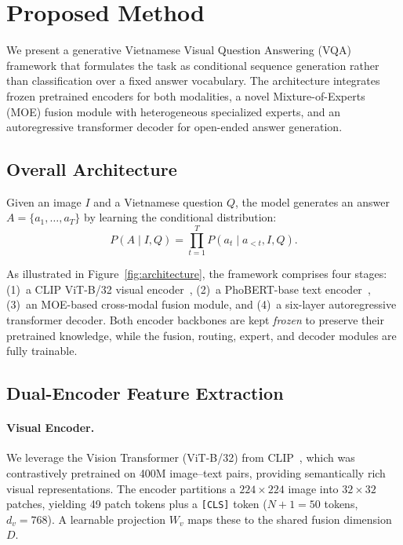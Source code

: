 \section{Proposed Method}
\label{sec:method}

We present a generative Vietnamese Visual Question Answering (VQA) framework that formulates the task as conditional sequence generation rather than classification over a fixed answer vocabulary. The architecture integrates frozen pretrained encoders for both modalities, a novel Mixture-of-Experts (MOE) fusion module with heterogeneous specialized experts, and an autoregressive transformer decoder for open-ended answer generation.

\subsection{Overall Architecture}
\label{sec:method:overview}

Given an image $I$ and a Vietnamese question $Q$, the model generates an answer $A = \{a_1, \ldots, a_T\}$ by learning the conditional distribution:
\begin{equation}
    P(A \mid I, Q) = \prod_{t=1}^{T} P(a_t \mid a_{<t}, I, Q).
    \label{eq:conditional_gen}
\end{equation}

As illustrated in Figure~\ref{fig:architecture}, the framework comprises four stages: (1)~a CLIP ViT-B/32 visual encoder~\cite{radford2021learning}, (2)~a PhoBERT-base text encoder~\cite{nguyen2020phobert}, (3)~an MOE-based cross-modal fusion module, and (4)~a six-layer autoregressive transformer decoder. Both encoder backbones are kept \textit{frozen} to preserve their pretrained knowledge, while the fusion, routing, expert, and decoder modules are fully trainable.

\subsection{Dual-Encoder Feature Extraction}
\label{sec:method:encoders}

\paragraph{Visual Encoder.}
We leverage the Vision Transformer (ViT-B/32) from CLIP~\cite{radford2021learning}, which was contrastively pretrained on 400M image--text pairs, providing semantically rich visual representations. The encoder partitions a $224{\times}224$ image into $32{\times}32$ patches, yielding 49 patch tokens plus a \texttt{[CLS]} token ($N{+}1 = 50$ tokens, $d_v = 768$). A learnable projection $W_v$ maps these to the shared fusion dimension~$D$.

